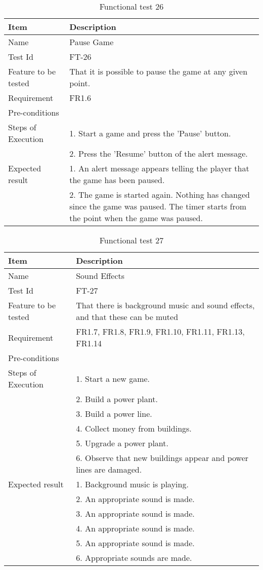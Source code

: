 \begin{table}[H]
\centering
	\begin{tabular}{ l | p{8cm} }
		\hline
		{\bf Item} & {\bf Description} \\ \hline
		Name & Pause Game \\ 
		Test Id & FT-26 \\ 
		Feature to be tested & That it is possible to pause the game at any given point. \\ 
		Requirement & FR1.6 \\ 
		Pre-conditions & \\ 
		Steps of Execution & 1. Start a game and press the 'Pause' button. \\
		& 2. Press the 'Resume' button of the alert message. \\
		Expected result & 1. An alert message appears telling the player that the game has been paused. \\
		& 2. The game is started again. Nothing has changed since the game was paused. The timer starts from the point when the game was paused. \\
	\end{tabular}
	\caption{Functional test 26}
\end{table}

\begin{table}[H]
\centering
	\begin{tabular}{ l | p{8cm} }
		\hline
		{\bf Item} & {\bf Description} \\ \hline
		Name & Sound Effects \\ 
		Test Id & FT-27 \\ 
		Feature to be tested & That there is background music and sound effects, and that these can be muted \\ 
		Requirement & FR1.7, FR1.8, FR1.9, FR1.10, FR1.11, FR1.13, FR1.14 \\ 
		Pre-conditions & \\ 
		Steps of Execution & 1. Start a new game. \\
		& 2. Build a power plant. \\
		& 3. Build a power line. \\
		& 4. Collect money from buildings. \\
		& 5. Upgrade a power plant. \\
		& 6. Observe that new buildings appear and power lines are damaged. \\
		Expected result & 1. Background music is playing. \\
		& 2. An appropriate sound is made. \\
		& 3. An appropriate sound is made. \\
		& 4. An appropriate sound is made. \\
		& 5. An appropriate sound is made. \\
		& 6. Appropriate sounds are made. \\
	\end{tabular}
	\caption{Functional test 27}
\end{table}

